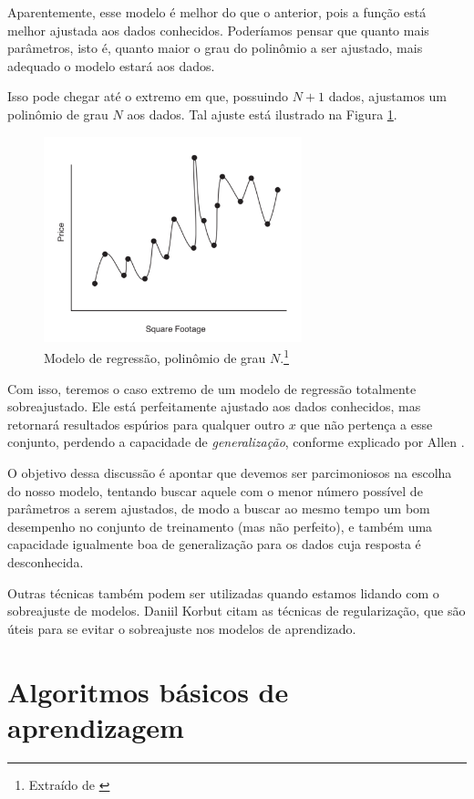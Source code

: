 Aparentemente, esse modelo é melhor do que o anterior, pois a função está melhor ajustada aos dados conhecidos. Poderíamos pensar que quanto mais parâmetros, isto é, quanto maior o grau do polinômio a ser ajustado, mais adequado o modelo estará aos dados. 

Isso pode chegar até o extremo em que, possuindo $N{+}1$ dados, ajustamos um polinômio de grau $N$ aos dados. Tal ajuste está ilustrado na Figura \ref{fig:over_reg_3}.

\begin{figure}[htb]
\centering
\includegraphics[width=7.5cm]{figuras/over_reg_3}
\caption{Modelo de regressão, polinômio de grau $N$.\footnote{Extraído de \citep{allen}}}
\label{fig:over_reg_3}
\end{figure}

Com isso, teremos o caso extremo de um modelo de regressão totalmente sobreajustado. Ele está perfeitamente ajustado aos dados conhecidos, mas retornará resultados espúrios para qualquer outro $x$ que não pertença a esse conjunto, perdendo a capacidade de \emph{generalização}, conforme explicado por Allen \citep{allen}.

O objetivo dessa discussão é apontar que devemos ser parcimoniosos na escolha do nosso modelo, tentando buscar aquele com o menor número possível de parâmetros a serem ajustados, de modo a buscar ao mesmo tempo um bom desempenho no conjunto de treinamento (mas não perfeito), e também uma capacidade igualmente boa de generalização para os dados cuja resposta é desconhecida.

Outras técnicas também podem ser utilizadas quando estamos lidando com o sobreajuste de modelos. Daniil Korbut \citep{korbut} citam as técnicas de regularização, que são úteis para se evitar o sobreajuste nos modelos de aprendizado.

\section{Algoritmos básicos de aprendizagem}

